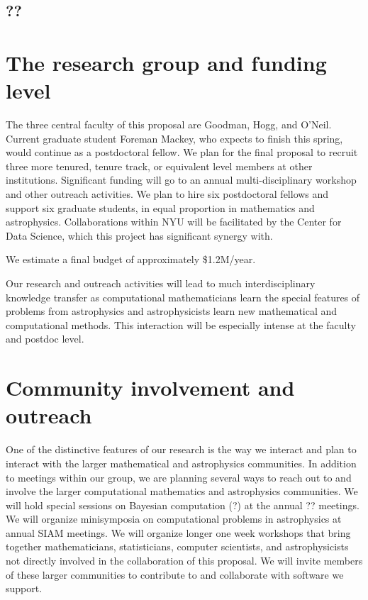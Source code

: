 \documentclass[12pt]{article}
\begin{document}
\subsection*{??}

\section*{The research group and funding level}
The three central faculty of this proposal are Goodman, Hogg, and O'Neil.
Current graduate student Foreman Mackey, who expects to finish this spring,
would continue as a postdoctoral fellow.
We plan for the final proposal to recruit three more tenured, tenure track, or
equivalent level members at other institutions.
Significant funding will go to an annual multi-disciplinary workshop and other
outreach activities.
We plan to hire six postdoctoral fellows and support six graduate students, in 
equal proportion in mathematics and astrophysics.
Collaborations within NYU will be facilitated by the Center for Data Science, which
this project has significant synergy with.

We estimate a final budget of approximately \$1.2M/year.

Our research and outreach activities will lead to much interdisciplinary knowledge transfer
as computational mathematicians learn the special features of problems from astrophysics
and astrophysicists learn new mathematical and computational methods.  
This interaction will be especially intense at the faculty and postdoc level.


\section*{Community involvement and outreach}
One of the distinctive features of our research is the way we interact and plan to interact
with the larger mathematical and astrophysics communities.
In addition to meetings within our group, we are planning several ways to reach out to
and involve the larger computational mathematics and astrophysics communities.
We will hold special sessions on Bayesian computation (?) at the annual ?? meetings.
We will organize minisymposia on computational problems in astrophysics at annual
SIAM meetings. 
We will organize longer one week workshops that bring together mathematicians, statisticians,
computer scientists, and astrophysicists not directly involved in the collaboration of this proposal.
We will invite members of these larger communities to contribute to and collaborate with 
software we support.
\end{document}
